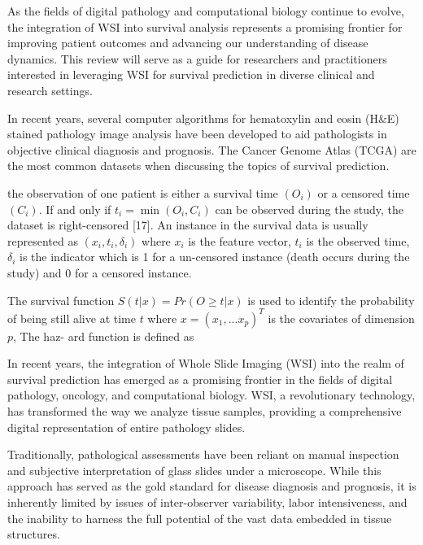 \documentclass[journal,twoside,web]{ieeecolor}
\begin{document}
As the fields of digital pathology and computational biology continue to evolve, the integration of WSI into survival analysis represents a promising frontier for improving patient outcomes and advancing our understanding of disease dynamics. This review will serve as a guide for researchers and practitioners interested in leveraging WSI for survival prediction in diverse clinical and research settings.

In recent years, several computer algorithms for hematoxylin and eosin (H\&E) stained pathology image analysis have been developed to aid pathologists in objective clinical diagnosis and prognosis.
The Cancer Genome Atlas (TCGA) are the most common datasets when discussing the topics of survival prediction.

the observation of one patient is either a survival time $(O_i)$ or a censored time $(C_i).$ If and only if $t_i=\min(O_i,C_i)$ can be observed during the study, the dataset is right-censored [17]. An instance in the survival data is usually represented as $(x_i,t_i,\delta_i)$ where $x_i$ is the feature vector, $t_i$ is the observed time, $\delta_i$ is the indicator which is 1 for a un-censored instance (death occurs during the study) and 0 for a censored instance.

The survival function $S(t|x)=Pr(O\geq t|x)$ is used to identify the probability of being still alive at time $t$ where $x=(x_1,...x_p)^T$ is the covariates of dimension $p$, The haz- ard function is defined as

In recent years, the integration of Whole Slide Imaging (WSI) into the realm of survival prediction has emerged as a promising frontier in the fields of digital pathology, oncology, and computational biology. WSI, a revolutionary technology, has transformed the way we analyze tissue samples, providing a comprehensive digital representation of entire pathology slides.

Traditionally, pathological assessments have been reliant on manual inspection and subjective interpretation of glass slides under a microscope. While this approach has served as the gold standard for disease diagnosis and prognosis, it is inherently limited by issues of inter-observer variability, labor intensiveness, and the inability to harness the full potential of the vast data embedded in tissue structures.
\end{document}
